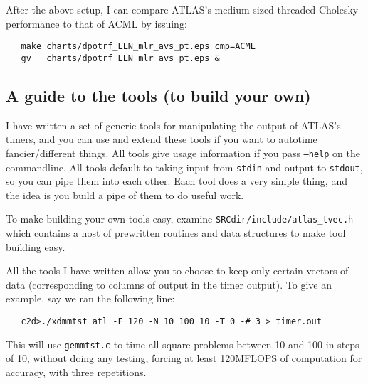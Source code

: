 \documentclass[11pt]{article}
\begin{document}
After the above setup, I can compare ATLAS's medium-sized threaded
Cholesky performance to that of ACML by issuing:
\begin{verbatim}
   make charts/dpotrf_LLN_mlr_avs_pt.eps cmp=ACML
   gv   charts/dpotrf_LLN_mlr_avs_pt.eps &
\end{verbatim}

\subsection{A guide to the tools (to build your own)}
I have written a set of generic tools for manipulating the output of
ATLAS's timers, and you can use and extend these tools if you want to
autotime fancier/different things.  All tools give usage information
if you pass {\tt --help} on the commandline.  All tools default to
taking input from {\tt stdin} and output to {\tt stdout}, so you can
pipe them into each other.  Each tool does a very simple thing, and
the idea is you build a pipe of them to do useful work.

To make building your own tools easy, examine 
{\tt SRCdir/include/atlas\_tvec.h}
which contains a host of prewritten routines and data structures to 
make tool building easy.

All the tools I have written allow you to choose to keep only certain
vectors of data (corresponding to columns of output in the timer output).
To give an example, say we ran the following line:
\begin{verbatim}
   c2d>./xdmmtst_atl -F 120 -N 10 100 10 -T 0 -# 3 > timer.out
\end{verbatim}

This will use {\tt gemmtst.c} to time all square problems between 10 and
100 in steps of 10, without doing any testing, forcing at least 120MFLOPS
of computation for accuracy, with three repetitions.
\end{document}
